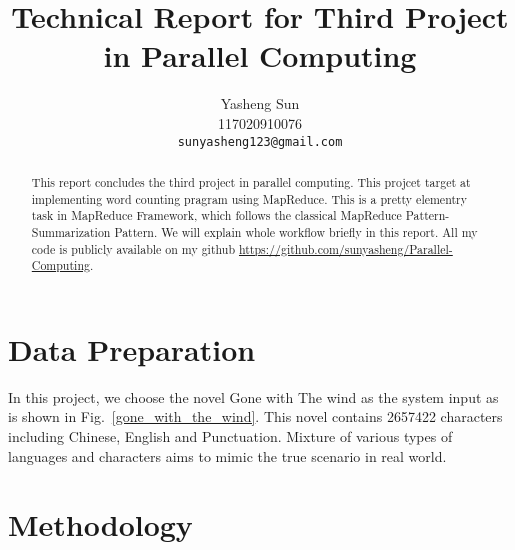 \documentclass[10pt,twocolumn,letterpaper]{article}
\begin{document}
    
    \title{Technical Report for Third Project in Parallel Computing}
    
    \author{Yasheng Sun\\
    117020910076\\
    {\tt\small sunyasheng123@gmail.com}
    }
    
    \maketitle
    
    \begin{abstract}
       This report concludes the third project in parallel computing. This projcet target
       at implementing word counting pragram using MapReduce. This is a pretty elementry task
       in MapReduce Framework, which follows the classical MapReduce Pattern-Summarization Pattern.
        We will explain whole workflow briefly in this report. 
       All my code is publicly available on my github
        \url{https://github.com/sunyasheng/Parallel-Computing}.

    \end{abstract}
    
    
    
    \section{Data Preparation}
    
    In this project, we choose the novel Gone with The wind as the system input as is shown
    in Fig.~\ref{gone_with_the_wind}. 
    This novel contains 2657422 characters including Chinese, English and Punctuation.
    Mixture of various types of languages and characters aims to mimic the true scenario
    in real world.

    \section{Methodology}
\end{document}
